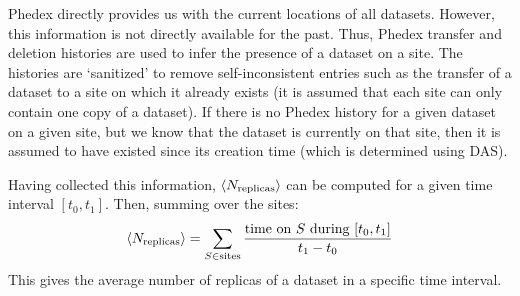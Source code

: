 
Phedex directly provides us with the current locations of all datasets. However, this information is not directly available for the past. Thus, Phedex transfer and deletion histories are used to infer the presence of a dataset on a site. The histories are `sanitized' to remove self-inconsistent entries such as the transfer of a dataset to a site on which it already exists (it is assumed that each site can only contain one copy of a dataset). If there is no Phedex history for a given dataset on a given site, but we know that the dataset is currently on that site, then it is assumed to have existed since its creation time (which is determined using DAS). 

Having collected this information, $\langle N_\text{replicas}\rangle$ can be computed for a given time interval $[t_0,t_1]$. Then, summing over the sites:
\begin{equation}
\langle N_\text{replicas}\rangle = \sum_{S\in \text{sites}} \dfrac{\text{time on }S\text{ during }[t_0,t_1]}{t_1-t_0}
\end{equation}
This gives the average number of replicas of a dataset in a specific time interval. 